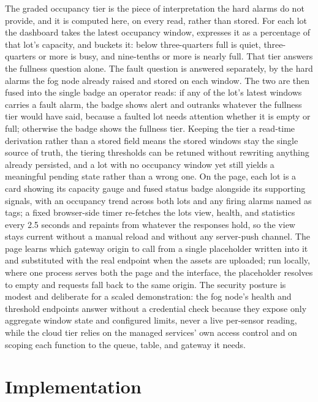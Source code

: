 \documentclass[conference]{IEEEtran}
\begin{document}
The graded occupancy tier is the piece of interpretation the hard alarms do not provide, and it is computed here, on every read, rather than stored. For each lot the dashboard takes the latest occupancy window, expresses it as a percentage of that lot's capacity, and buckets it: below three-quarters full is quiet, three-quarters or more is busy, and nine-tenths or more is nearly full. That tier answers the fullness question alone. The fault question is answered separately, by the hard alarms the fog node already raised and stored on each window. The two are then fused into the single badge an operator reads: if any of the lot's latest windows carries a fault alarm, the badge shows alert and outranks whatever the fullness tier would have said, because a faulted lot needs attention whether it is empty or full; otherwise the badge shows the fullness tier. Keeping the tier a read-time derivation rather than a stored field means the stored windows stay the single source of truth, the tiering thresholds can be retuned without rewriting anything already persisted, and a lot with no occupancy window yet still yields a meaningful pending state rather than a wrong one. On the page, each lot is a card showing its capacity gauge and fused status badge alongside its supporting signals, with an occupancy trend across both lots and any firing alarms named as tags; a fixed browser-side timer re-fetches the lots view, health, and statistics every 2.5 seconds and repaints from whatever the responses hold, so the view stays current without a manual reload and without any server-push channel. The page learns which gateway origin to call from a single placeholder written into it and substituted with the real endpoint when the assets are uploaded; run locally, where one process serves both the page and the interface, the placeholder resolves to empty and requests fall back to the same origin. The security posture is modest and deliberate for a scaled demonstration: the fog node's health and threshold endpoints answer without a credential check because they expose only aggregate window state and configured limits, never a live per-sensor reading, while the cloud tier relies on the managed services' own access control and on scoping each function to the queue, table, and gateway it needs.

\section{Implementation}
\end{document}
